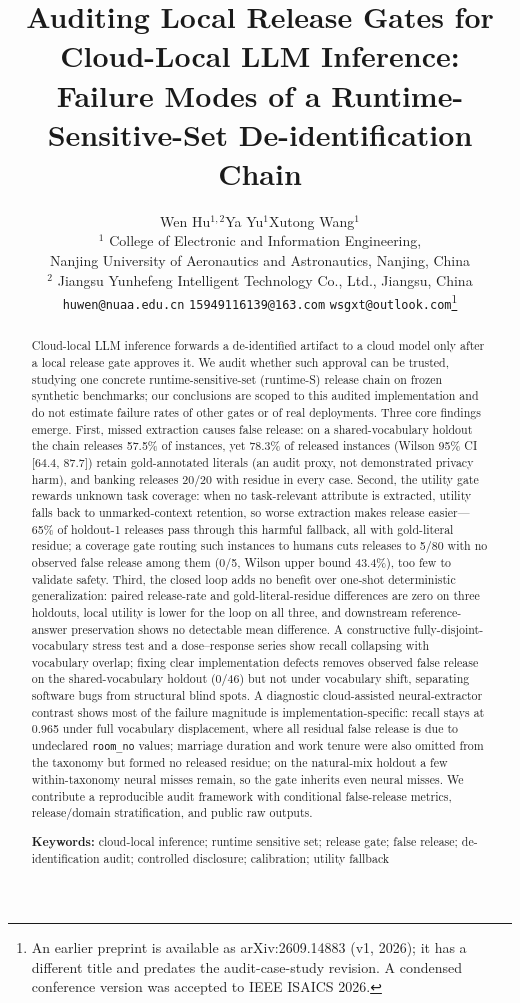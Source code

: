 \documentclass[11pt,a4paper]{article}
\title{Auditing Local Release Gates for Cloud-Local LLM Inference:\\
Failure Modes of a Runtime-Sensitive-Set De-identification Chain}
\author{Wen Hu$^{1,2}$\quad Ya Yu$^{1}$\quad Xutong Wang$^{1}$\\[2pt]
\small $^{1}$ College of Electronic and Information Engineering,\\
\small Nanjing University of Aeronautics and Astronautics, Nanjing, China\\
\small $^{2}$ Jiangsu Yunhefeng Intelligent Technology Co., Ltd., Jiangsu, China\\
\texttt{\small huwen@nuaa.edu.cn}\quad
\texttt{\small 15949116139@163.com}\quad
\texttt{\small wsgxt@outlook.com}\thanks{An earlier preprint is available as arXiv:2609.14883 (v1, 2026); it has a different title and predates the audit-case-study revision. A condensed conference version was accepted to IEEE ISAICS 2026.}}
\date{}
\begin{document}
\maketitle

\begin{abstract}
Cloud-local LLM inference forwards a de-identified artifact to a cloud model only after a local release gate approves it. We audit whether such approval can be trusted, studying one concrete runtime-sensitive-set (runtime-S) release chain on frozen synthetic benchmarks; our conclusions are scoped to this audited implementation and do not estimate failure rates of other gates or of real deployments. Three core findings emerge. First, missed extraction causes false release: on a shared-vocabulary holdout the chain releases 57.5\% of instances, yet 78.3\% of released instances (Wilson 95\% CI [64.4, 87.7]) retain gold-annotated literals (an audit proxy, not demonstrated privacy harm), and banking releases 20/20 with residue in every case. Second, the utility gate rewards unknown task coverage: when no task-relevant attribute is extracted, utility falls back to unmarked-context retention, so worse extraction makes release easier---65\% of holdout-1 releases pass through this harmful fallback, all with gold-literal residue; a coverage gate routing such instances to humans cuts releases to 5/80 with no observed false release among them (0/5, Wilson upper bound 43.4\%), too few to validate safety. Third, the closed loop adds no benefit over one-shot deterministic generalization: paired release-rate and gold-literal-residue differences are zero on three holdouts, local utility is lower for the loop on all three, and downstream reference-answer preservation shows no detectable mean difference. A constructive fully-disjoint-vocabulary stress test and a dose--response series show recall collapsing with vocabulary overlap; fixing clear implementation defects removes observed false release on the shared-vocabulary holdout (0/46) but not under vocabulary shift, separating software bugs from structural blind spots. A diagnostic cloud-assisted neural-extractor contrast shows most of the failure magnitude is implementation-specific: recall stays at 0.965 under full vocabulary displacement, where all residual false release is due to undeclared \texttt{room\_no} values; marriage duration and work tenure were also omitted from the taxonomy but formed no released residue; on the natural-mix holdout a few within-taxonomy neural misses remain, so the gate inherits even neural misses. We contribute a reproducible audit framework with conditional false-release metrics, release/domain stratification, and public raw outputs.

\medskip
\noindent\textbf{Keywords:} cloud-local inference; runtime sensitive set; release gate; false release; de-identification audit; controlled disclosure; calibration; utility fallback
\end{abstract}
\end{document}
